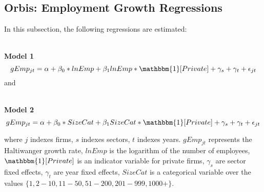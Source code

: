 \documentclass[12pt,notitlepage]{article}
\begin{document}
\begin{table}[htbp]
\end{table}

\begin{table}[htbp]
\end{table}


\clearpage



\subsection{Orbis: Employment Growth Regressions}

In this subsection, the following regressions are estimated: \\~\

\textbf{Model 1}
	\begin{equation*}
		gEmp_{jt} = \alpha + \beta_0 * lnEmp + \beta_1 lnEmp*\mathbbm{1}[Private] + \gamma_s + \gamma_t + \epsilon_{jt} 
	\end{equation*}
and\\~\

\textbf{Model 2}
	\begin{equation*}
		gEmp_{jt} = \alpha + \beta_0 * SizeCat + \beta_1 SizeCat*\mathbbm{1}[Private] + \gamma_s + \gamma_t + \epsilon_{jt} 
	\end{equation*}

where $j$ indexes firms, $s$ indexes sectors, $t$ indexes years. $gEmp_{jt}$ represents the Haltiwanger growth rate, $lnEmp$ is the logarithm of the number of employees, $\mathbbm{1}[Private]$ is an indicator variable for private firms,  $\gamma_s$ are sector fixed effects, $\gamma_t$ are year fixed effects, $SizeCat$  is a categorical variable over the values $\lbrace1,2-10,11-50,51-200,201-999,1000+ \rbrace$.\\~\
\end{document}

